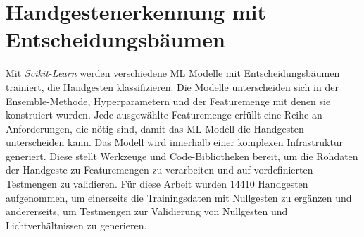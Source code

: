 \chapter{Handgestenerkennung mit Entscheidungsbäumen}
Mit \textit{Scikit-Learn} werden verschiedene ML Modelle mit Entscheidungsbäumen trainiert, die Handgesten klassifizieren. Die Modelle unterscheiden sich in der Ensemble-Methode, Hyperparametern und
der Featuremenge mit denen sie konstruiert wurden. Jede ausgewählte Featuremenge erfüllt eine Reihe an Anforderungen, die nötig sind, damit das ML Modell die Handgesten unterscheiden kann.
\newline
\newline
Das Modell wird innerhalb einer komplexen Infrastruktur generiert. Diese stellt Werkzeuge und Code-Bibliotheken bereit, um die Rohdaten der Handgeste zu Featuremengen zu verarbeiten und auf vordefinierten
Testmengen zu validieren. Für diese Arbeit wurden 14410 Handgesten aufgenommen, um einerseits die Trainingsdaten mit Nullgesten zu ergänzen und andererseits, um Testmengen zur Validierung von Nullgesten
und Lichtverhältnissen zu generieren.




